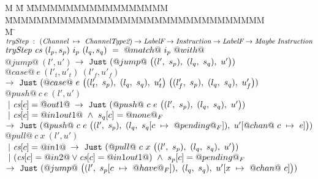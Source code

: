 

\newcommand\nextStep[5]{\big((#1,~#2),~(#3,~#4),~#5 \big)}


\begin{figure*}
\begin{tabbing}
M \= M \= MMMMMMMMMMMMMMMMMM \= MMMMMMMMMMMMMMMMMMMMMMMMMMMMMMMMMM \= \kill
$\textit{tryStep} ~:~ (\textit{Channel} ~\mapsto~ \textit{ChannelType2}) \to \textit{LabelF} \to \textit{Instruction} \to \textit{LabelF} \to \textit{Maybe}~\textit{Instruction}$ \\
$\textit{tryStep} ~\textit{cs}~(l_p,s_p)~i_p~(l_q,s_q)~=~@match@~i_p~@with@$ \\

\> $@jump@~(l',u')$ 
\> \> $\to~\Just (@jump@~
      \nextStep
        {l'}{s_p}
        {l_q}{s_q}
        {u'})
      $ 
\> 
\\[1ex]

\> $@case@~e~(l'_t,u'_t)~(l'_f,u'_f)$
\> \> $\to~\Just (@case@~e~
      \nextStep
        {l'_t}{s_p}
        {l_q}{s_q}
        {u'_t}
      ~
      \nextStep
        {l'_f}{s_p}
        {l_q}{s_q}
        {u'_f})
      $ 
\> 
\\[1ex]

\> $@push@~c~e~(l',u')$ \\
\> \> $~|~\textit{cs}[c]=@out1@$ 
\> $\to~\Just (@push@~c~e~
      \nextStep
        {l'}
          {s_p}
        {l_q}
          {s_q}
        {u'})
      $ 
\> \\

\> \> $~|~\textit{cs}[c]=@in1out1@ ~\wedge~ s_q[c]=@none@_F$ 
\> $\to~\Just (@push@~c~e~
      \nextStep
        {l'}
          {s_p}
        {l_q}
          {\HeapUpdateOne{c}{@pending@_F}{s_q}}
        {\HeapUpdateOne{@chan@~c}{e}{u'}})
      $
\> 
\\[1ex]


\> $@pull@~c~x~(l',u')$ \\
\> \> $~|~\textit{cs}[c]=@in1@$ 
\> $\to~\Just (@pull@~c~x~
      \nextStep
        {l'}{s_p}
        {l_q}{s_q}
        {u'})
    $ 
\> 
\\[1ex]

\> \> $~|~(\textit{cs}[c]=@in2@ \vee \textit{cs}[c]=@in1out1@) ~\wedge~ s_p[c]=@pending@_F$ \\
\> \> $\to~\Just (@jump@~
      \nextStep
        {l'}
          {\HeapUpdateOne{c}{@have@_F}{s_p}}
        {l_q}
          {s_q}
        {\HeapUpdateOne{x}{@chan@~c}{u'}})
        $ 
\> \>  
\\[1ex]


\end{tabbing}
\end{figure*}
